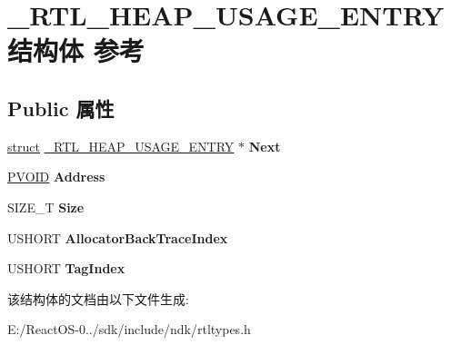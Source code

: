 \hypertarget{struct___r_t_l___h_e_a_p___u_s_a_g_e___e_n_t_r_y}{}\section{\+\_\+\+R\+T\+L\+\_\+\+H\+E\+A\+P\+\_\+\+U\+S\+A\+G\+E\+\_\+\+E\+N\+T\+R\+Y结构体 参考}
\label{struct___r_t_l___h_e_a_p___u_s_a_g_e___e_n_t_r_y}
\subsection*{Public 属性}
\begin{DoxyCompactItemize}
\item 
\mbox{\label{struct___r_t_l___h_e_a_p___u_s_a_g_e___e_n_t_r_y_a887b0ac61472a1dc3f1305fe2174e073}} 
\hyperlink{interfacestruct}{struct} \hyperlink{struct___r_t_l___h_e_a_p___u_s_a_g_e___e_n_t_r_y}{\+\_\+\+R\+T\+L\+\_\+\+H\+E\+A\+P\+\_\+\+U\+S\+A\+G\+E\+\_\+\+E\+N\+T\+RY} $\ast$ {\bfseries Next}
\item 
\mbox{\label{struct___r_t_l___h_e_a_p___u_s_a_g_e___e_n_t_r_y_a233c135adaaac74a2c455d195da0a4e8}} 
\hyperlink{interfacevoid}{P\+V\+O\+ID} {\bfseries Address}
\item 
\mbox{\label{struct___r_t_l___h_e_a_p___u_s_a_g_e___e_n_t_r_y_a9962a357ef191048b7b26275fb21f8a9}} 
S\+I\+Z\+E\+\_\+T {\bfseries Size}
\item 
\mbox{\label{struct___r_t_l___h_e_a_p___u_s_a_g_e___e_n_t_r_y_a3e9e0e8720e242ca437e71b7a09aa489}} 
U\+S\+H\+O\+RT {\bfseries Allocator\+Back\+Trace\+Index}
\item 
\mbox{\label{struct___r_t_l___h_e_a_p___u_s_a_g_e___e_n_t_r_y_a417ccc5b3bbf07dcb574612443541c17}} 
U\+S\+H\+O\+RT {\bfseries Tag\+Index}
\end{DoxyCompactItemize}


该结构体的文档由以下文件生成\+:\begin{DoxyCompactItemize}
\item 
E\+:/\+React\+O\+S-\/0../sdk/include/ndk/rtltypes.\+h\end{DoxyCompactItemize}
